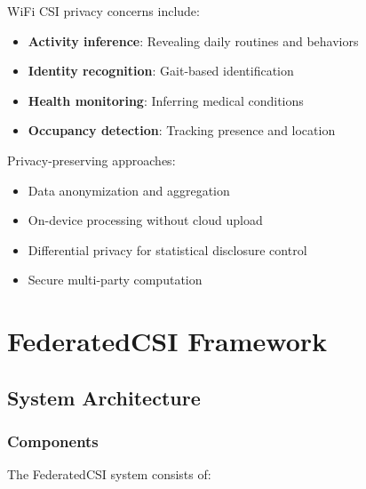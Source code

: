 \documentclass[journal]{IEEEtran}
\begin{document}
WiFi CSI privacy concerns include:
\begin{itemize}
\item \textbf{Activity inference}: Revealing daily routines and behaviors
\item \textbf{Identity recognition}: Gait-based identification
\item \textbf{Health monitoring}: Inferring medical conditions
\item \textbf{Occupancy detection}: Tracking presence and location
\end{itemize}

Privacy-preserving approaches:
\begin{itemize}
\item Data anonymization and aggregation
\item On-device processing without cloud upload
\item Differential privacy for statistical disclosure control
\item Secure multi-party computation
\end{itemize}

\section{FederatedCSI Framework}

\subsection{System Architecture}

\subsubsection{Components}
The FederatedCSI system consists of:
\end{document}
